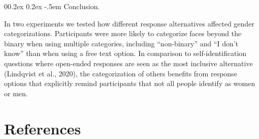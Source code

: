 \documentclass[
  man,
  longtable,
  nolmodern,
  notxfonts,
  notimes,
  colorlinks=true,linkcolor=blue,citecolor=blue,urlcolor=blue]{apa7}
\makeatletter
\renewcommand{\paragraph}{\@startsection{paragraph}{4}{\parindent}%
	{0\baselineskip \@plus 0.2ex \@minus 0.2ex}%
	{-.5em}%
	{\normalfont\normalsize\bfseries\typesectitle}}
\makeatother
\begin{document}
\paragraph{Conclusion.}\label{conclusion}

In two experiments we tested how different response alternatives
affected gender categorizations. Participants were more likely to
categorize faces beyond the binary when using multiple categories,
including ``non-binary'' and ``I don't know'' than when using a free
text option. In comparison to self-identification questions where
open-ended responses are seen as the most inclusive alternative
(Lindqvist et al., 2020), the categorization of others benefits from
response options that explicitly remind participants that not all people
identify as women or men.

\newpage

\section{References}\label{references}
\end{document}
